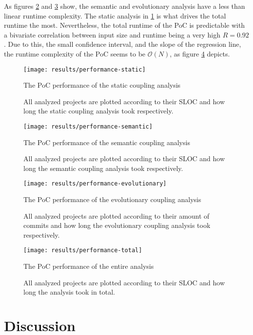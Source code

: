 \documentclass[12pt,a4paper]{report}
\begin{document}
As figures \ref{fig:performance-semantic} and \ref{fig:performance-evolutionary}
show, the semantic and evolutionary analysis have a less than linear runtime complexity.
The static analysis in \ref{fig:performance-static} is what drives the total runtime
the most. Nevertheless, the total runtime of the PoC is predictable with
a bivariate correlation between input size and runtime being a very high \(R = 0.92\).
Due to this, the small confidence interval, and the slope of the regression line,
the runtime complexity of the PoC seems to be \(\mathcal{O}(N)\),
as figure \ref{fig:performance-total} depicts.

\begin{figure}[htbp]
\centering
\texttt{[image: results/performance-static]}
\caption{The PoC performance of the static coupling analysis}
\caption*{\centering
  All analyzed projects are plotted according to their SLOC
  and how long the static coupling analysis took respectively.
}
\label{fig:performance-static}
\end{figure}

\begin{figure}[htbp]
\centering
\texttt{[image: results/performance-semantic]}
\caption{The PoC performance of the semantic coupling analysis}
\caption*{\centering
  All analyzed projects are plotted according to their SLOC
  and how long the semantic coupling analysis took respectively.
}
\label{fig:performance-semantic}
\end{figure}

\begin{figure}[htbp]
\centering
\texttt{[image: results/performance-evolutionary]}
\caption{The PoC performance of the evolutionary coupling analysis}
\caption*{\centering
  All analyzed projects are plotted according to their amount of commits
  and how long the evolutionary coupling analysis took respectively.
}
\label{fig:performance-evolutionary}
\end{figure}

\begin{figure}[htbp]
\centering
\texttt{[image: results/performance-total]}
\caption{The PoC performance of the entire analysis}
\caption*{\centering
  All analyzed projects are plotted according to their SLOC
  and how long the analysis took in total.
}
\label{fig:performance-total}
\end{figure}




\chapter{Discussion} \label{chap:discussion}
\end{document}
